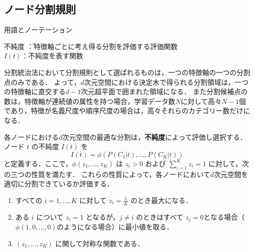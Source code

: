 \documentclass[dvipdfmx]{jreport}
\begin{document}
\subsection{ノード分割規則}
\label{ノード分割規則}
\begin{itembox}[l]{\large{用語とノーテーション}}
    \begin{tabbing}
        \hspace{15pt} \raisebox{0.5ex}{\tiny $\bullet$} 不純度 \hspace{1pt}\=：特徴軸ごとに考え得る分割を評価する評価関数\\[0.5em]
        \hspace{15pt} \raisebox{0.5ex}{\tiny $\bullet$} ${I}(t)$\>：不純度を表す関数
    \end{tabbing}
\end{itembox}

分割統治法において分割規則として選ばれるものは，一つの特徴軸の一つの分割点のみである．
よって，$d$次元空間における決定木で得られる分割領域は，一つの特徴軸に直交する$d-1$次元超平面で囲まれた領域になる．
また分割候補点の数は，特徴軸が連続値の属性を持つ場合，学習データ数$N$に対して高々$N-1$個であり，特徴が名義尺度や順序尺度の場合は，高々それらのカテゴリー数だけになる．

各ノードにおける$d$次元空間の最適な分割は，\textbf{不純度}によって評価し選択する．
ノード $t$ の不純度 ${I}(t)$ を
\begin{equation}
    {I}(t) = \phi(P(C_1|t), \dots, P(C_K|t)) \label{eq:6}
\end{equation}
と定義する．ここで，$\phi(z_1, \dots, z_K)$ は $z_i > 0$ および $\sum_{i=1}^{K} z_i = 1$ に対して，次の三つの性質を満たす．
これらの性質によって，各ノードにおいて$d$次元空間を適切に分割できているか評価する．

\begin{tcolorbox}[title=\textbf{関数$\phi(z_1, \dots, z_K)$の満たす性質}]
    \begin{enumerate}
        \item すべての $i = 1, \dots, K$ に対して $z_i = \frac{1}{K}$ のとき最大になる．
        \item ある $i$ について $z_i = 1$ となるが，$j \neq i$ のときはすべて $z_j = 0$となる場合（$\phi(1, 0, \dots, 0)$のようになる場合）に最小値を取る．
        \item $(z_1, \dots, z_K)$ に関して対称な関数である．
    \end{enumerate}
\end{tcolorbox}
\end{document}

